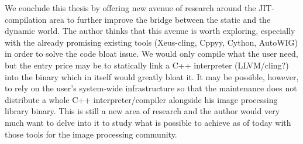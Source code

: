 We conclude this thesis by offering new avenue of research around the JIT-compilation area to further improve the bridge
between the static and the dynamic world. The author thinks that this avenue is worth exploring, especially with the
already promising existing tools (Xeus-cling, Cppyy, Cython, AutoWIG) in order to solve the code bloat issue. We would
only compile what the user need, but the entry price may be to statically link a C++ interpreter (LLVM/cling?) into the
binary which in itself would greatly bloat it. It may be possible, however, to rely on the user's system-wide
infrastructure so that the maintenance does not distribute a whole C++ interpreter/compiler alongside his image
processing library binary. This is still a new area of research and the author would very much want to delve into it to
study what is possible to achieve as of today with those tools for the image processing community.





